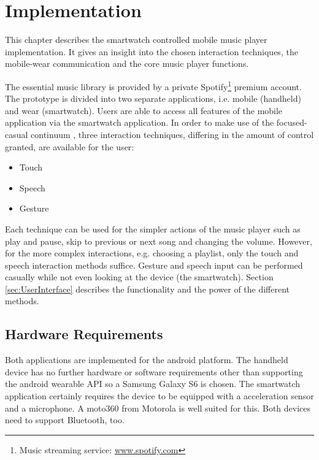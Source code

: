 \chapter{Implementation}\label{ch:implementation}

This chapter describes the smartwatch controlled mobile music player implementation. It gives an insight into the chosen interaction techniques, the mobile-wear communication and the core music player functions.

The essential music library is provided by a private Spotify\footnote{Music streaming service: \url{www.spotify.com}} premium account. The prototype is divided into two separate applications, i.e. mobile (handheld) and wear (smartwatch). Users are able to access all features of the mobile application via the smartwatch application. In order to make use of the focused-casual continuum \cite{pohl2013focused}, three interaction techniques, differing in the amount of control granted, are available for the user:
\begin{itemize}
\item{Touch}
\item{Speech}
\item{Gesture}
\end{itemize}
Each technique can be used for the simpler actions of the music player such as play and pause, skip to previous or next song and changing the volume. However, for the more complex interactions, e.g. choosing a playlist, only the touch and speech interaction methods suffice. Gesture and speech input can be performed casually while not even looking at the device (the smartwatch). Section \ref{sec:UserInterface} describes the functionality and the power of the different methods.

\section{Hardware Requirements}\label{sec:hardwarerequirements}
Both applications are implemented for the android platform. The handheld device has no further hardware or software requirements other than supporting the android wearable \ac{API} so a Samsung Galaxy S6 is chosen. The smartwatch application certainly requires the device to be equipped with a acceleration sensor and a microphone. A moto360 from Motorola is well suited for this. Both devices need to support Bluetooth, too.


